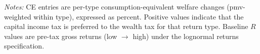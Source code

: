 
\begin{table}[!htbp]
\centering
\caption{Per-Type Consumption-Equivalent Welfare Change and Baseline Return (WT vs CIT, Lognormal Returns)}
\label{tab:ce_per_type_wt_vs_cit_lognorm}


\vspace{0.4em}
\begin{minipage}{0.95\textwidth}
\footnotesize
\textit{Notes:} CE entries are per-type consumption-equivalent welfare changes
(pmv-weighted within type), expressed as percent. Positive values indicate
that the capital income tax is preferred to the wealth tax for that return
type. Baseline $R$ values are pre-tax gross returns (low $\rightarrow$ high)
under the lognormal returns specification.
\end{minipage}
\end{table}
